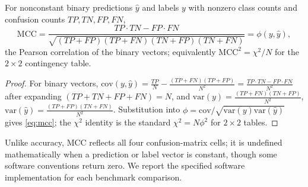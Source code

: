 \begin{proposition}
\label{prop:mcc}
For nonconstant binary predictions $\hat y$ and labels $y$ with nonzero
class counts and confusion counts
$TP, TN, FP, FN$,
\begin{equation}
\mathrm{MCC} = \frac{TP \cdot TN - FP \cdot FN}
 {\sqrt{(TP{+}FP)(TP{+}FN)(TN{+}FP)(TN{+}FN)}}
 = \phi(y, \hat y),
\label{eq:mcc}
\end{equation}
the Pearson correlation of the binary vectors; equivalently
$\mathrm{MCC}^2 = \chi^2 / N$ for the $2\times 2$ contingency table.
\end{proposition}
\begin{proof}
For binary vectors, $\mathrm{cov}(y,\hat y) = \frac{TP}{N} -
\frac{(TP{+}FN)(TP{+}FP)}{N^2} = \frac{TP \cdot TN - FP \cdot FN}{N^2}$
after expanding $(TP{+}TN{+}FP{+}FN) = N$, and
$\mathrm{var}(y) = \frac{(TP{+}FN)(TN{+}FP)}{N^2}$,
$\mathrm{var}(\hat y) = \frac{(TP{+}FP)(TN{+}FN)}{N^2}$. Substitution into
$\phi = \mathrm{cov}/\sqrt{\mathrm{var}(y)\mathrm{var}(\hat y)}$ gives
\eqref{eq:mcc}; the $\chi^2$ identity is the standard
$\chi^2 = N\phi^2$ for $2 \times 2$ tables.
\end{proof}

Unlike accuracy, MCC reflects all four confusion-matrix cells; it is
undefined mathematically when a prediction or label vector is constant,
though some software conventions return zero. We report the specified
software implementation for each benchmark comparison.
